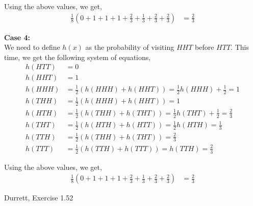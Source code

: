\documentclass[12pt]{article}
\newenvironment{problem}[2][Problem]{\begin{trivlist}
\item[\hskip \labelsep {\bfseries #1}\hskip \labelsep {\bfseries #2.}]}{\end{trivlist}}
\begin{document}
Using the above values, we get,
\begin{align*}
\frac{1}{8}\left(0 + 1 + 1 + 1 + \frac{2}{3} + \frac{1}{3} + \frac{2}{3} + \frac{2}{3}\right) &= \frac{2}{3}
\end{align*}

\textbf{Case 4:}\\

We need to define $h(x)$ as the probability of visiting $HHT$ before $HTT$. This time, we get the following system of equations,
\begin{align*}
h(HTT) &= 0\\
h(HHT) &= 1\\
h(HHH) &= \frac{1}{2}(h(HHH) + h(HHT)) = \frac{1}{2}h(HHH) + \frac{1}{2} = 1\\
h(THH) &= \frac{1}{2}(h(HHH) + h(HHT)) = 1\\
h(HTH) &= \frac{1}{2}(h(THH) + h(THT)) = \frac{1}{2}h(THT) + \frac{1}{2} = \frac{2}{3}\\
h(THT) &= \frac{1}{2}(h(HTH) + h(HTT)) = \frac{1}{2}h(HTH) = \frac{1}{3}\\
h(TTH) &= \frac{1}{2}(h(THH) + h(THT)) = \frac{2}{3}\\
h(TTT) &= \frac{1}{2}(h(TTH) + h(TTT)) = h(TTH) = \frac{2}{3}
\end{align*}

Using the above values, we get,
\begin{align*}
\frac{1}{8}\left(0 + 1 + 1 + 1 + \frac{2}{3} + \frac{1}{3} + \frac{2}{3} + \frac{2}{3}\right) &= \frac{2}{3}
\end{align*}

\begin{problem}{2}
Durrett, Exercise 1.52
\end{problem}
\end{document}

